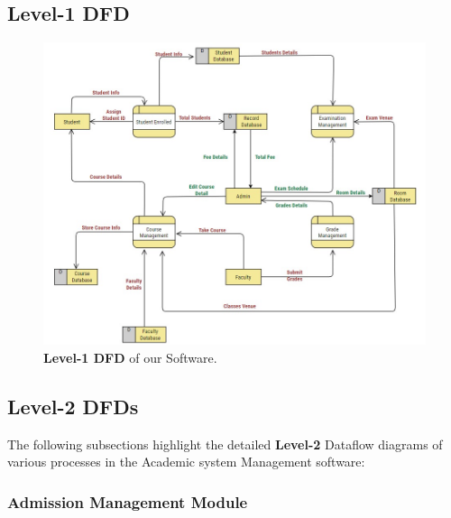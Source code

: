 \documentclass[12pt,a4paper]{article}
\begin{document}
\subsection{Level-1 DFD}
\begin{figure}[H]
    \centering
        \includegraphics[scale=0.7]{Level_1_DFD.jpg} 
    \caption{\textbf{Level-1 DFD} of our Software.}
\end{figure}


\subsection{Level-2 DFDs}
The following subsections highlight the detailed \textbf{Level-2} Dataflow diagrams of various processes in the Academic system Management software:
\subsubsection{Admission Management Module}
\end{document}
